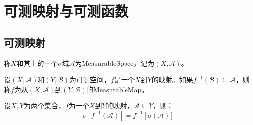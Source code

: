 \section{可测映射与可测函数}
\subsection{可测映射}
\begin{definition}
	称$X$和其上的一个$\sigma$域$\mathscr{A}$为\gls{MeasurableSpace}，记为$(X,\mathscr{A})$。
\end{definition}
\begin{definition}
	设$(X,\mathscr{A})$和$(Y,\mathscr{B})$为可测空间，$f$是一个$X$到$Y$的映射。如果$f^{-1}(\mathscr{B})\subseteq\mathscr{A}$，则称$f$为从$(X,\mathscr{A})$到$(Y,\mathscr{B})$的\gls{MeasurableMap}。
\end{definition}
\begin{lemma}\label{lem:PreimageSigmaField}
	设$X,Y$为两个集合，$f$为一个$X$到$Y$的映射，$\mathscr{A}\subseteq Y$，则：
	\begin{equation*}
		\sigma[f^{-1}(\mathscr{A})]=f^{-1}[\sigma(\mathscr{A})]
	\end{equation*}
\end{lemma}
